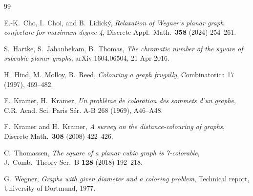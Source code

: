 \documentclass[10pt,a4paper]{article}
\begin{document}
\begin{thebibliography}{99}



 
  E.-K.~Cho, I.~Choi, and B.~Lidick\'{y},
{\em Relaxation of Wegner's planar graph conjecture for maximum degree 4},
Discrete Appl.\ Math.\ {\bf 358} (2024) 254--261.




 S.~Hartke, S.~Jahanbekam, B.~Thomas, {\em The chromatic number of the square of subcubic planar graphs}, arXiv:1604.06504, 21 Apr 2016. 

H.~Hind, M.~Molloy, B.~Reed, 
{\em Colouring a graph frugally},
Combinatorica 17 (1997), 469--482.

 F.~Kramer, H.~Kramer, {\em Un probl\`{e}me de coloration des sommets d'un graphe},  C.R. Acad. Sci. Paris S\' er. A-B 268 (1969), A46--A48.


   F.~Kramer and H.~Kramer,
    {\em A    survey on the distance-colouring of graphs},
    Discrete Math.\ {\bf 308} (2008) 422--426.

 C.~Thomassen, {\em The square of a planar cubic graph is 7-colorable}, J.\ Comb.\ Theory Ser.\ B {\bf 128} (2018) 192--218.

 G.~Wegner, {\em Graphs with given diameter and a coloring problem}, Technical report, University of Dortmund, 1977. 


\end{thebibliography}
\end{document}
